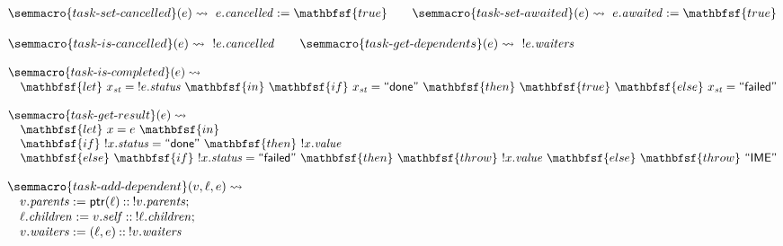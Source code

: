 \vspace{0.75em}
\noindent
$\begin{array}{@{}l@{}}
\semmacro{task\text{-}set\text{-}cancelled}(e) \rightsquigarrow\
  e.\mathit{cancelled} := \mathbfsf{true}
\qquad
\semmacro{task\text{-}set\text{-}awaited}(e) \rightsquigarrow\
  e.\mathit{awaited} := \mathbfsf{true}
\end{array}$

\vspace{0.75em}
\noindent
$\begin{array}{@{}l@{}}
\semmacro{task\text{-}is\text{-}cancelled}(e) \rightsquigarrow\ {!e.\mathit{cancelled}}
\qquad
\semmacro{task\text{-}get\text{-}dependents}(e) \rightsquigarrow\ {!e.\mathit{waiters}}
\end{array}$

\vspace{0.75em}
\noindent
$\begin{array}{@{}l@{}}
\semmacro{task\text{-}is\text{-}completed}(e) \rightsquigarrow \\
\quad \mathbfsf{let}\ x_{\mathit{st}} = {!e.\mathit{status}}\ \mathbfsf{in}\
  \mathbfsf{if}\ x_{\mathit{st}} = \textsf{``done''}\
  \mathbfsf{then}\ \mathbfsf{true}\
  \mathbfsf{else}\ x_{\mathit{st}} = \textsf{``failed''}
\end{array}$

\vspace{0.75em}
\noindent
$\begin{array}{@{}l@{}}
\semmacro{task\text{-}get\text{-}result}(e) \rightsquigarrow \\
\quad \mathbfsf{let}\ x = e\ \mathbfsf{in} \\
\quad \mathbfsf{if}\ {!x.\mathit{status}} = \textsf{``done''}\
      \mathbfsf{then}\ {!x.\mathit{value}} \\
\quad \mathbfsf{else}\ \mathbfsf{if}\ {!x.\mathit{status}} = \textsf{``failed''}\
      \mathbfsf{then}\ \mathbfsf{throw}\ {!x.\mathit{value}}\
      \mathbfsf{else}\ \mathbfsf{throw}\ \textsf{``IME''}
\end{array}$

\vspace{0.75em}
\noindent
$\begin{array}{@{}l@{}}
\semmacro{task\text{-}add\text{-}dependent}(v, \ell, e) \rightsquigarrow \\
\quad v.\mathit{parents} := \mathsf{ptr}(\ell) \mathbin{::} {!v.\mathit{parents}} \mathbin{;} \\
\quad \ell.\mathit{children} := v.\mathit{self} \mathbin{::} {!\ell.\mathit{children}} \mathbin{;} \\
\quad v.\mathit{waiters} := (\ell, e) \mathbin{::} {!v.\mathit{waiters}}
\end{array}$

